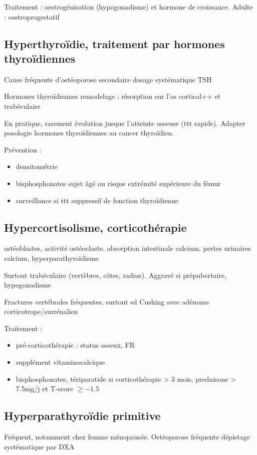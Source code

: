 \documentclass[11pt]{article}
\begin{document}
Traitement : oestrogénisation (hypogonadisme) et hormone de croissance. Adulte :
oestroprogestatif

\subsection{Hyperthyroïdie, traitement par hormones thyroïdiennes}
\label{sec:orgd3f5a4c}
Cause fréquente d'ostéoporose secondaire \thus dosage systématique TSH

Hormones thyroïdiennes \inc remodelage : résorption sur l'os cortical++ et trabéculaire

En pratique, rarement évolution jusque l'atteinte osseuse (ttt
rapide). Adapter posologie hormones thyroïdiennes au cancer thyroïdien.

Prévention :
\begin{itemize}
\item densitométrie
\item bisphosphonates sujet âgé ou risque extrémité supérieure du fémur
\item surveillance si ttt suppressif de fonction thyroïdienne
\end{itemize}

\subsection{Hypercortisolisme, corticothérapie}
\label{sec:orga2c9128}

\dec ostéoblastes, \inc activité ostéoclaste. \dec absorption intestinale
calcium, \inc pertes urinaires calcium, hyperparathyroïdisme

Surtout trabéculaire (vertèbres, côtes, radius). Aggravé si prépubertaire, hypogonadisme

Fractures vertébrales fréquentes, surtout sd Cushing avec adénome corticotrope/surrénalien

Traitement : 
\begin{itemize}
\item pré-corticothérapie : status osseux, FR
\item supplément vitaminocalcique
\item bisphosphonates, tériparatide si corticothérapie > 3 mois, prednisone > 7.5mg/j
et T-score \(\ge -1.5\)
\end{itemize}

\subsection{Hyperparathyroïdie primitive}
\label{sec:org37d2942}
Fréquent, notamment chez femme ménopausée. Ostéoporose fréquente \thus dépistage
systématique par DXA
\end{document}
